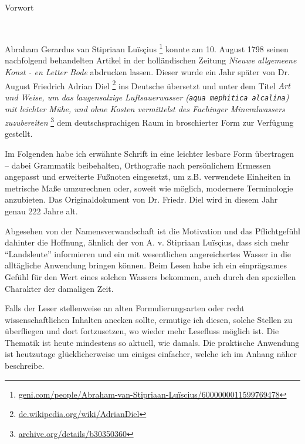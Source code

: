 \documentclass[a5paper,fontsize=10pt]{memoir}
\begin{document}

{\centering
{\Large Vorwort}
\vspace{2em}

\begin{minipage}{4cm}
  \hrulefill\\
\end{minipage}

}
\vfill
Abraham Gerardus van Stipriaan Luïsçius%
\footnote{\href{https://web.archive.org/web/20210927050342/https://www.geni.com/people/Abraham-van-Stipriaan-Luïscius/6000000011599769478}
{geni.com/people/Abraham-van-Stipriaan-Luïscius/6000000011599769478}}
konnte am 10. August 1798
seinen nachfolgend behandelten Artikel in der holländischen Zeitung
\emph{Nieuwe allgemeene Konst - en Letter Bode}
abdrucken lassen.
Dieser wurde ein Jahr später
von Dr. August Friedrich Adrian Diel%
\footnote{\href{https://web.archive.org/web/20160828042236/https://de.wikipedia.org/wiki/Adrian_Diel}
{de.wikipedia.org/wiki/Adrian\textunderscore Diel}}
ins Deutsche übersetzt und unter dem Titel
\emph{Art und Weise,
um das laugensalzige Luftsauerwasser
(\texttt{aqua mephitica alcalina})
mit leichter Mühe, und ohne Kosten
vermittelst des Fachinger Mineralwassers zuzubereiten}%
\footnote{\href{https://archive.org/details/b30350360}
{archive.org/details/b30350360}}
dem deutschsprachigen Raum in broschierter Form
zur Verfügung gestellt.

Im Folgenden habe ich erwähnte Schrift
in eine leichter lesbare Form übertragen --
dabei Grammatik beibehalten,
Orthografie nach persönlichem Ermessen angepasst
und erweiterte Fußnoten eingesetzt,
um z.B. verwendete Einheiten in metrische Maße umzurechnen
oder, soweit wie möglich, modernere Terminologie anzubieten.
Das Originaldokument von Dr. Friedr. Diel
wird in diesem Jahr genau 222 Jahre alt.

Abgesehen von der Namensverwandschaft
ist die Motivation und das Pflichtgefühl dahinter
die Hoffnung,
ähnlich der von A. v. Stipriaan Luïsçius,
dass sich mehr ``Landsleute'' informieren und ein
mit wesentlichen 
angereichertes Wasser
in die alltägliche Anwendung bringen können.
Beim Lesen habe ich ein einprägsames Gefühl für den Wert
eines solchen Wassers bekommen,
auch durch den speziellen Charakter der damaligen Zeit.

Falls der Leser
stellenweise an alten Formulierungsarten
oder recht wissenschaftlichen Inhalten anecken
sollte, ermutige ich diesen,
solche Stellen zu überfliegen und dort fortzusetzen,
wo wieder mehr Lesefluss möglich ist.
Die Thematik ist heute mindestens so aktuell, wie damals.
Die praktische Anwendung 
ist heutzutage glücklicherweise um einiges einfacher,
welche ich im Anhang näher beschreibe.
\end{document}
